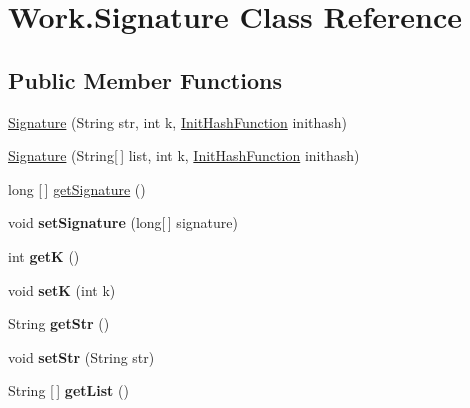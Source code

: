 \hypertarget{classWork_1_1Signature}{}\section{Work.\+Signature Class Reference}
\label{classWork_1_1Signature}
\subsection*{Public Member Functions}
\begin{DoxyCompactItemize}
\item 
\hyperlink{classWork_1_1Signature_a3df52c35d659fa6051c9b2811e44cb40}{Signature} (String str, int k, \hyperlink{classWork_1_1InitHashFunction}{Init\+Hash\+Function} inithash)
\item 
\hyperlink{classWork_1_1Signature_afa20e0bec14472d84074b9c7dcbfed17}{Signature} (String\mbox{[}$\,$\mbox{]} list, int k, \hyperlink{classWork_1_1InitHashFunction}{Init\+Hash\+Function} inithash)
\item 
long \mbox{[}$\,$\mbox{]} \hyperlink{classWork_1_1Signature_aca6bfa5004179f13eda1ce04b8a74ded}{get\+Signature} ()
\item 
\mbox{\label{classWork_1_1Signature_aa6120c12f290a4b27222cd03d02a2780}} 
void {\bfseries set\+Signature} (long\mbox{[}$\,$\mbox{]} signature)
\item 
\mbox{\label{classWork_1_1Signature_ada892752d9079caaa6ca43ce01f4f858}} 
int {\bfseries getK} ()
\item 
\mbox{\label{classWork_1_1Signature_ac31074a82f3a00cd2dafd1ed7ece70eb}} 
void {\bfseries setK} (int k)
\item 
\mbox{\label{classWork_1_1Signature_ad85cfb16257e156b071469d92df14fc1}} 
String {\bfseries get\+Str} ()
\item 
\mbox{\label{classWork_1_1Signature_a761e92f3e9631c98f0b9cacd8ee2946c}} 
void {\bfseries set\+Str} (String str)
\item 
\mbox{\label{classWork_1_1Signature_acdb6fbfb8d800d9aeea063dbfbd37f56}} 
String \mbox{[}$\,$\mbox{]} {\bfseries get\+List} ()
\item 

\end{DoxyCompactItemize}
